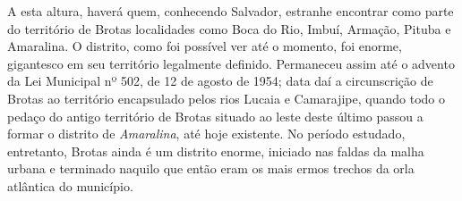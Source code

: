 A esta altura, haverá quem, conhecendo Salvador, estranhe encontrar como parte do território de Brotas localidades como Boca do Rio, Imbuí, Armação, Pituba e Amaralina. O distrito, como foi possível ver até o momento, foi enorme, gigantesco em seu território legalmente definido. Permaneceu assim até o advento da Lei Municipal nº 502, de 12 de agosto de 1954; data daí a circunscrição de Brotas ao território encapsulado pelos rios Lucaia e Camarajipe, quando todo o pedaço do antigo território de Brotas situado ao leste deste último passou a formar o distrito de \textit{Amaralina}, até hoje existente. No período estudado, entretanto, Brotas ainda é um distrito enorme, iniciado nas faldas da malha urbana e terminado naquilo que então eram os mais ermos trechos da orla atlântica do município.